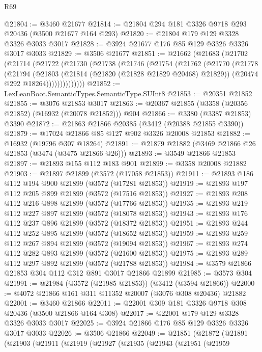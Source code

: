 \begin{lexlean}{R69}
\begin{coremodule}
@21804 := @3460 @21677
@21814 := @21804 @294 @181 @3326 @9718 @293 @20436 (@3500 @21677 @164 @293)
@21820 := @21804 @179 @129 @3328 @3326 @3033 @3017
@21828 := @3924 @21677 @176 @85 @129 @3326 @3326 @3017 @3033
@21829 := @3506 @21677
@21851 := @21662
    (@21683
      (@21702
        (@21714
          (@21722
            (@21730
              (@21738
                (@21746
                  (@21754
                    (@21762
                      (@21770
                        (@21778
                          (@21794
                            (@21803
                              (@21814 (@21820 (@21828 @21829 @20468) @21829))
                              (@20474 @292 @18264))))))))))))))
@21852 := LexLeanBoot.SemanticTypes.SemanticType.SUInt8
@21853 := @20351 @21852
@21855 := @3076 @21853 @3017
@21863 := @20367 @21855 (@3358 (@20356 @21852) (@16932 (@20078 @21852))) @904
@21866 := @3380 (@3387 @21853) @3390
@21872 := @21863 @21866 @20385 (@3412 (@20388 @21855 @3390))
@21879 := @17024 @21866 @85 @127 @902 @3326 @20008 @21853
@21882 := @16932 (@19796 @307 @18264)
@21891 := @21879 @21882 (@3469 @21866 @26 @21853 (@3474 (@3475 @21866 @26)))
@21893 := @3549 @21866 @21853
@21897 := @21893 @155 @112 @183 @901
@21899 := @3358 @20008 @21882
@21903 := @21897 @21899 (@3572 (@17058 @21853))
@21911 := @21893 @186 @112 @194 @900 @21899 (@3572 (@17281 @21853))
@21919 := @21893 @197 @112 @205 @899 @21899 (@3572 (@17516 @21853))
@21927 := @21893 @208 @112 @216 @898 @21899 (@3572 (@17766 @21853))
@21935 := @21893 @219 @112 @227 @897 @21899 (@3572 (@18078 @21853))
@21943 := @21893 @176 @112 @237 @896 @21899 (@3572 (@18372 @21853))
@21951 := @21893 @244 @112 @252 @895 @21899 (@3572 (@18652 @21853))
@21959 := @21893 @259 @112 @267 @894 @21899 (@3572 (@19094 @21853))
@21967 := @21893 @274 @112 @282 @893 @21899 (@3572 (@21600 @21853))
@21975 := @21893 @289 @112 @297 @892 @21899 (@3572 (@21788 @21853))
@21984 := @3579 @21866 @21853 @304 @112 @312 @891 @3017 @21866 @21899
@21985 := @3573 @304
@21991 := @21984 (@3572 (@21985 @21853)) (@3412 (@3594 @21866))
@22000 := @4072 @21866 @161 @311 @11352 @20007 (@3076 @308 @20436) @21882
@22001 := @3460 @21866
@22011 := @22001 @309 @181 @3326 @9718 @308 @20436 (@3500 @21866 @164 @308)
@22017 := @22001 @179 @129 @3328 @3326 @3033 @3017
@22025 := @3924 @21866 @176 @85 @129 @3326 @3326 @3017 @3033
@22026 := @3506 @21866
@22049 := @21851
    (@21872
      (@21891
        (@21903
          (@21911
            (@21919
              (@21927
                (@21935
                  (@21943
                    (@21951
                      (@21959

\end{coremodule}
\end{lexlean}
